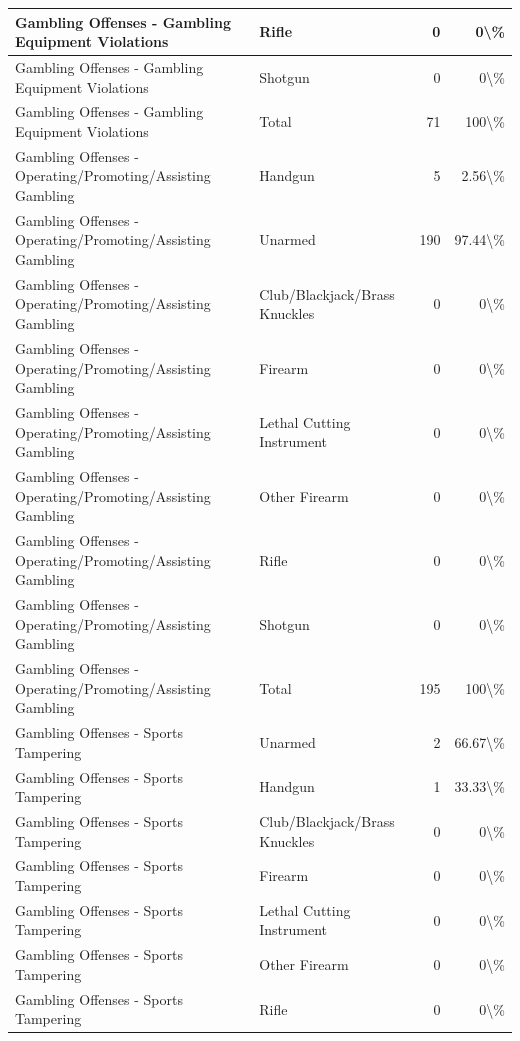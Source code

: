 \documentclass[
]{krantz}
\begin{document}
\begin{longtable}[t]{l|l|r|r}
\hline
Gambling Offenses - Gambling Equipment Violations & Rifle & 0 & 0\textbackslash{}\%\\
\hline
Gambling Offenses - Gambling Equipment Violations & Shotgun & 0 & 0\textbackslash{}\%\\
\hline
Gambling Offenses - Gambling Equipment Violations & Total & 71 & 100\textbackslash{}\%\\
\hline
Gambling Offenses - Operating/Promoting/Assisting Gambling & Handgun & 5 & 2.56\textbackslash{}\%\\
\hline
Gambling Offenses - Operating/Promoting/Assisting Gambling & Unarmed & 190 & 97.44\textbackslash{}\%\\
\hline
Gambling Offenses - Operating/Promoting/Assisting Gambling & Club/Blackjack/Brass Knuckles & 0 & 0\textbackslash{}\%\\
\hline
Gambling Offenses - Operating/Promoting/Assisting Gambling & Firearm & 0 & 0\textbackslash{}\%\\
\hline
Gambling Offenses - Operating/Promoting/Assisting Gambling & Lethal Cutting Instrument & 0 & 0\textbackslash{}\%\\
\hline
Gambling Offenses - Operating/Promoting/Assisting Gambling & Other Firearm & 0 & 0\textbackslash{}\%\\
\hline
Gambling Offenses - Operating/Promoting/Assisting Gambling & Rifle & 0 & 0\textbackslash{}\%\\
\hline
Gambling Offenses - Operating/Promoting/Assisting Gambling & Shotgun & 0 & 0\textbackslash{}\%\\
\hline
Gambling Offenses - Operating/Promoting/Assisting Gambling & Total & 195 & 100\textbackslash{}\%\\
\hline
Gambling Offenses - Sports Tampering & Unarmed & 2 & 66.67\textbackslash{}\%\\
\hline
Gambling Offenses - Sports Tampering & Handgun & 1 & 33.33\textbackslash{}\%\\
\hline
Gambling Offenses - Sports Tampering & Club/Blackjack/Brass Knuckles & 0 & 0\textbackslash{}\%\\
\hline
Gambling Offenses - Sports Tampering & Firearm & 0 & 0\textbackslash{}\%\\
\hline
Gambling Offenses - Sports Tampering & Lethal Cutting Instrument & 0 & 0\textbackslash{}\%\\
\hline
Gambling Offenses - Sports Tampering & Other Firearm & 0 & 0\textbackslash{}\%\\
\hline
Gambling Offenses - Sports Tampering & Rifle & 0 & 0\textbackslash{}\%\\

\end{longtable}
\end{document}
